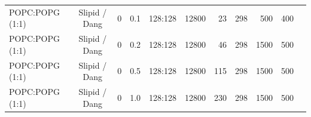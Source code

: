 \documentclass[journal=jpcbfk]{achemso}
\begin{document}
\begin{table}[htb]
\begin{minipage}[t]{\textwidth}
{\begin{tabular}{l c c r r r r r r c c}
      POPC:POPG (1:1)        & Slipid / Dang \cite{jambeck12b,jambeck2012another,smith94,dang06} & 0         & 0.1  & 128:128 & 12800 & 23  &  298  & 500 & 400 & \cite{slipidPOPC50POPG50T298K} \\
      POPC:POPG (1:1)        & Slipid / Dang \cite{jambeck12b,jambeck2012another,smith94,dang06} & 0         & 0.2  & 128:128 & 12800 & 46  &  298  & 1500 & 500 & \cite{slipidPOPC50POPG50T298K} \\
      POPC:POPG (1:1)        & Slipid / Dang \cite{jambeck12b,jambeck2012another,smith94,dang06} & 0         & 0.5  & 128:128 & 12800 & 115 &  298  & 1500 & 500 & \cite{slipidPOPC50POPG50T298K} \\
      POPC:POPG (1:1)        & Slipid / Dang \cite{jambeck12b,jambeck2012another,smith94,dang06} & 0         & 1.0  & 128:128 & 12800 & 230 &  298  & 1500 & 500 & \cite{slipidPOPC50POPG50T298K} \\
    \end{tabular}
    }
  \end{minipage}
     \\
\end{table}
\end{document}
